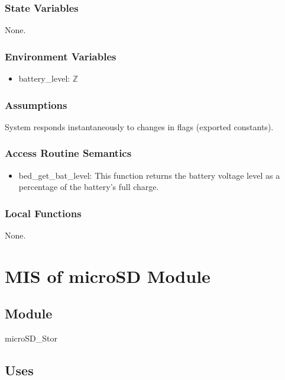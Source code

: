 \documentclass[12pt, titlepage]{article}
\begin{document}
\subsubsection{State Variables}

None.

\subsubsection{Environment Variables}

\begin{itemize}
\item battery\_level: $\mathbb{Z}$
\end{itemize}

\subsubsection{Assumptions}

System responds instantaneously to changes in flags (exported constants).

\subsubsection{Access Routine Semantics}

\begin{itemize}
\item bed\_get\_bat\_level: This function returns the battery voltage level as a percentage of the battery's full charge.
\end{itemize}

\subsubsection{Local Functions}
None.

\newpage


\section{MIS of microSD Module} \label{mDS_1} 

\subsection{Module}

microSD\_Stor

\subsection{Uses}
\end{document}
